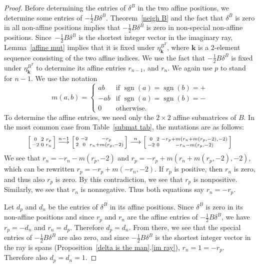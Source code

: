\documentclass{amsart}
\theoremstyle{definition}
\theoremstyle{remark}
\numberwithin{equation}{section}
\newcommand{\sgn}{\operatorname{sgn}}
\newcommand{\0}{{\mathbf{0}}}
\newcommand{\kk}{{\boldsymbol{k}}}
\begin{document}
\begin{proof}
Before determining the entries of $\delta^B$ in the two affine positions, we determine some entries of $-\frac12B\delta^B$.
Theorem~\ref{neigh B} and the fact that $\delta^B$ is zero in all non-affine positions implies that $-\frac12B\delta^B$ is zero in non-special non-affine positions.
Since~$-\frac12B\delta^B$ is the shortest integer vector in the imaginary ray, Lemma~\ref{affine mut} implies that it is fixed under $\eta^{B^T}_\kk$, where $\kk$ is a $2$-element sequence consisting of the two affine indices. 
We use the fact that $-\frac12B\delta^B$ is fixed under $\eta^{B^T}_\kk$ to determine its affine entries $r_{n-1}$, and $r_n$.
We again use $p$ to stand for $n-1$.
We use the notation 
\[m(a,b)=\begin{cases}
ab&\text{if }\sgn(a)=\sgn(b)=+\\
-ab&\text{if }\sgn(a)=\sgn(b)=-\\
0&\text{otherwise}.
\end{cases}\]
To determine the affine entries, we need only the $2\times2$ affine submatrices of $B$.
In the most common case from Table~\ref{submat tab}, the mutations are as follows:
\[
\begin{bsmallmatrix*}
0 & 2 & r_p\\
-2 & 0 & r_n
\end{bsmallmatrix*}\overset{n-1}{\longrightarrow}
\begin{bsmallmatrix*}
0 & -2 & -r_p\\
2 & 0 & r_n+m(r_p,-2)
\end{bsmallmatrix*}\overset{n}{\longrightarrow}
\begin{bsmallmatrix*}
0 & 2 & -r_p+m(r_n+m(r_p,-2),-2)\\
-2 & 0 & -r_n-m(r_p,-2)
\end{bsmallmatrix*}
\]
We see that $r_n=-r_n-m(r_p,-2)$ and $r_p=-r_p+m(r_n+m(r_p,-2),-2)$, which can be rewritten $r_p=-r_p+m(-r_n,-2)$.
If $r_p$ is positive, then $r_n$ is zero, and thus also $r_p$ is zero.
By this contradiction, we see that $r_p$ is nonpositive.
Similarly, we see that $r_n$ is nonnegative.
Thus both equations say $r_n=-r_p$.

Let $d_p$ and $d_n$ be the entries of $\delta^B$ in its affine positions.
Since $\delta^B$ is zero in its non-affine positions and since $r_p$ and $r_n$ are the affine entries of $-\frac12B\delta^B$, we have $r_p=-d_n$ and $r_n=d_p$.
Therefore $d_p=d_n$.
From there, we see that the special entries of $-\frac12B\delta^B$ are also zero, and since $-\frac12B\delta^B$ is the shortest integer vector in the ray is spans (Proposition~\ref{delta is the man}.\ref{im ray}), $r_n=1=-r_p$.
Therefore also $d_p=d_n=1$.


\end{proof}
\end{document}
